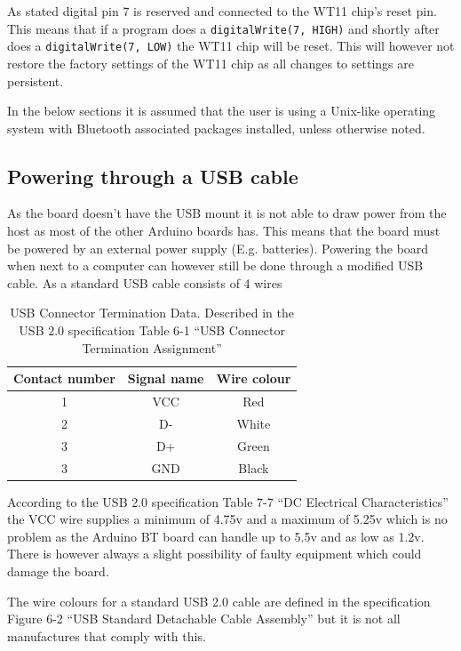 \documentclass[a4paper, oneside, final]{memoir}
\begin{document}
As stated digital pin 7 is reserved and connected to the WT11 chip's reset
pin. This means that if a program does a \texttt{digitalWrite(7, HIGH)} and
shortly after does a \texttt{digitalWrite(7, LOW)} the WT11 chip will be
reset. This will however not restore the factory settings of the WT11 chip as
all changes to settings are persistent.

In the below sections it is assumed that the user is using a Unix-like operating
system with Bluetooth associated packages installed, unless otherwise noted.

\subsection{Powering through a USB  cable}

As the board doesn't have the USB mount it is not able to draw power from the
host as most of the other Arduino boards has. This means that the board must be
powered by an external power supply (E.g. batteries). Powering the board when
next to a computer can however still be done through a modified USB cable. As a
standard USB cable consists of 4 wires

\begin{table}[h!]
  \centering
  \begin{tabular}{|c|c|c|}
    \hline
    Contact number & Signal name & Wire colour \\ \hline
    1 & VCC & Red \\ \hline
    2 & D- & White \\ \hline
    3 & D+ & Green \\ \hline
    3 & GND & Black \\ \hline
  \end{tabular}
  \caption{USB Connector Termination Data. Described in the USB 2.0
    specification\cite{usb20} Table 6-1 ``USB Connector Termination Assignment''}
  \label{tab:ArduinoBT:Connector_Termination_Data}
\end{table}

According to the USB 2.0 specification\cite{usb20} Table 7-7 ``DC Electrical
Characteristics'' the VCC wire supplies a minimum of 4.75v and a maximum of
5.25v which is no problem as the Arduino BT board can handle up to 5.5v and as
low as 1.2v. There is however always a slight possibility of faulty equipment
which could damage the board.

The wire colours for a standard USB 2.0 cable are defined in the
specification\cite{usb20} Figure 6-2 ``USB Standard Detachable Cable Assembly''
but it is not all manufactures that comply with this.
\end{document}
